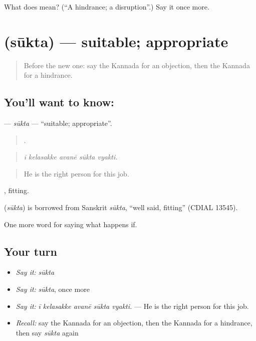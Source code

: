\begin{tcolorbox}[breakable,colback=teal!4,colframe=teal!35!black,title={Before you move on}]
What does  mean? (\textquotedblleft{}A hindrance; a disruption\textquotedblright{}.) Say it once more.
\end{tcolorbox}
\section[\texorpdfstring{\kn{ಸೂಕ್ತ} (sūkta)}{ಸೂಕ್ತ (sūkta)}]{ (sūkta) — suitable; appropriate}

\label{lesson:KA-C432-sukta}



\begin{quote}
Before the new one: say the Kannada for an objection, then the Kannada for a hindrance.
\end{quote}

\subsection*{You'll want to know: }
\textbf{} — \emph{sūkta} — \textquotedblleft{}suitable; appropriate\textquotedblright{}.

\begin{quote}
    .
\end{quote}

\begin{quote}
\emph{ī kelasakke avanē sūkta vyakti.}
\end{quote}

\begin{quote}
He is the right person for this job.
\end{quote}

, fitting.

\begin{cousinweb}
\textbf{} (\emph{sūkta}) is borrowed from Sanskrit \emph{sūkta}, \textquotedblleft{}well said, fitting\textquotedblright{} (CDIAL 13545).
\end{cousinweb}

\begin{grammarlens}[title={What you've built}]
One more word for saying what happens if.
\end{grammarlens}

\subsection*{Your turn}
\begin{itemize}
\raggedright
  \item \emph{Say it:} \emph{sūkta}
  \item \emph{Say it:} \emph{sūkta}, once more
  \item \emph{Say it:} \emph{ī kelasakke avanē sūkta vyakti.} — He is the right person for this job.
  \item \emph{Recall:} say the Kannada for an objection, then the Kannada for a hindrance, then say \emph{sūkta} again
\end{itemize}

